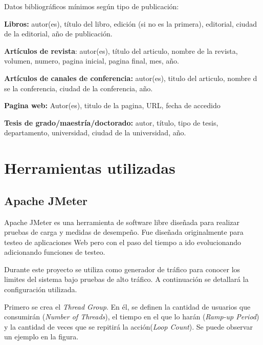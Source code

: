 \documentclass[12pt,a4paper,oneside]{book}
\begin{document}


Datos bibliográficos mínimos según tipo de publicación:

\textbf{Libros:} autor(es), título del libro, edición (si no es la primera), editorial, ciudad de la editorial, año de publicación.

\textbf{Artículos de revista}: autor(es), título del articulo, nombre de la revista, volumen, numero, pagina inicial, pagina final, mes, año.

\textbf{Artículos de canales de conferencia:} autor(es), titulo del articulo, nombre d se la conferencia, ciudad de la conferencia, año.

\textbf{Pagina web:} Autor(es), titulo de la pagina, URL, fecha de accedido

\textbf{Tesis de grado/maestría/doctorado:} autor, título, tipo de tesis, departamento, universidad, ciudad de la universidad, año.


\appendix %

\chapter{Herramientas utilizadas}

\section{Apache JMeter}
\label{AnexoJMeter}

Apache JMeter es una herramienta de software libre diseñada para realizar pruebas de carga y medidas de desempeño. Fue diseñada originalmente para testeo de aplicaciones Web pero con el paso del tiempo a ido evolucionando adicionando funciones de testeo.

\vspace{0.5cm}

Durante este proyecto se utiliza como generador de tráfico para conocer los limites del sistema bajo pruebas de alto tráfico. A continuación se detallará la configuración utilizada.

\vspace{0.5cm}

Primero se crea el \textit{Thread Group}. En él, se definen la cantidad de usuarios que consumirán (\textit{Number of Threads}), el tiempo en el que lo harán (\textit{Ramp-up Period}) y la cantidad de veces que se repitirá la acción(\textit{Loop Count}). Se puede observar un ejemplo en la figura.
\end{document}
